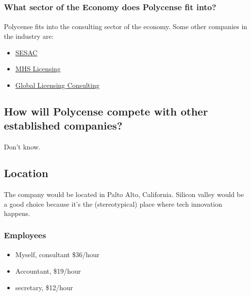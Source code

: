 \subsubsection{What sector of the Economy does Polycense fit into?}
\paragraph{}
Polycense fits into the consulting sector of the economy. Some other
companies in the industry are:

\begin{itemize}
	\item{\href{https://www.sesac.com/Home.aspx}{SESAC}}
	\item{\href{https://www.mhslicensing.com/services/consulting.html}{MHS Licensing}}
	\item{\href{http://www.licensingc.com/}{Global Licensing Consulting}}
\end{itemize}
\par

\subsection{How will Polycense compete with other established companies?}
\paragraph{}
Don't know.
\par

\subsection{Location}
\paragraph{} The company would be located in Palto Alto, California. Silicon
valley would be a good choice because it's the (stereotypical) place where
tech innovation happens.

\subsubsection{Employees}
\paragraph{}
\begin{itemize}
	\item{Myself, consultant \$36/hour~\cite{payscale.com2016con}}
	\item{Accountant, \$19/hour~\cite{payscale.com2016acnt}}
	\item{secretary, \$12/hour~\cite{payscale.com2016sec}}
\end{itemize}
\par

